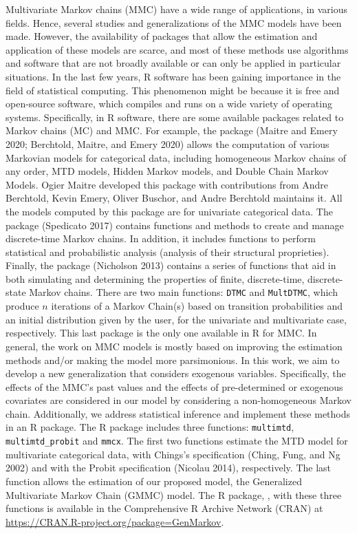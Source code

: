 Multivariate Markov chains (MMC) have a wide range of applications, in various fields. Hence, several studies and generalizations of the MMC models have been made. However, the availability of packages that allow the estimation and application of these models are scarce, and most of these methods use algorithms and software that are not broadly available or can only be applied in particular situations. In the last few years, R software has been gaining importance in the field of statistical computing. This phenomenon might be because it is free and open-source software, which compiles and runs on a wide variety of operating systems. Specifically, in R software, there are some available packages related to Markov chains (MC) and MMC. For example, the  package (Maitre and Emery 2020; Berchtold, Maitre, and Emery 2020) allows the computation of various Markovian models for categorical data, including homogeneous Markov chains of any order, MTD models, Hidden Markov models, and Double Chain Markov Models. Ogier Maitre developed this package with contributions from Andre Berchtold, Kevin Emery, Oliver Buschor, and Andre Berchtold maintains it. All the models computed by this package are for univariate categorical data. The  package (Spedicato 2017) contains functions and methods to create and manage discrete-time Markov chains. In addition, it includes functions to perform statistical and probabilistic analysis (analysis of their structural proprieties). Finally, the  package (Nicholson 2013) contains a series of functions that aid in both simulating and determining the properties of finite, discrete-time, discrete-state Markov chains. There are two main functions: \texttt{DTMC} and \texttt{MultDTMC}, which produce \(n\) iterations of a Markov Chain(s) based on transition probabilities and an initial distribution given by the user, for the univariate and multivariate case, respectively. This last package is the only one available in R for MMC. In general, the work on MMC models is mostly based on improving the estimation methods and/or making the model more parsimonious. In this work, we aim to develop a new generalization that considers exogenous variables. Specifically, the effects of the MMC's past values and the effects of pre-determined or exogenous covariates are considered in our model by considering a non-homogeneous Markov chain. Additionally, we address statistical inference and implement these methods in an R package. The R package includes three functions: \texttt{multimtd}, \texttt{multimtd\_probit} and \texttt{mmcx}. The first two functions estimate the MTD model for multivariate categorical data, with Chings's specification (Ching, Fung, and Ng 2002) and with the Probit specification (Nicolau 2014), respectively. The last function allows the estimation of our proposed model, the Generalized Multivariate Markov Chain (GMMC) model. The R package, , with these three functions is available in the Comprehensive R Archive Network (CRAN) at \url{https://CRAN.R-project.org/package=GenMarkov}.

